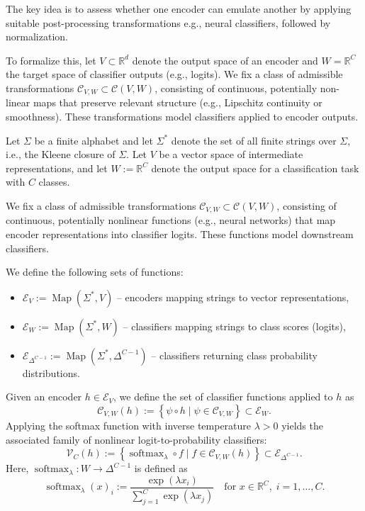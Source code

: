 The key idea is to assess whether one encoder can emulate another by applying suitable post-processing transformations e.g., neural classifiers, followed by normalization.

To formalize this, let \( V \subset \mathbb{R}^d \) denote the output space of an encoder and \( W = \mathbb{R}^C \) the target space of classifier outputs (e.g., logits).
We fix a class of admissible transformations \( \mathcal{C}_{V,W} \subset \mathcal{C}(V,W) \), consisting of continuous, potentially non-linear maps that preserve relevant structure (e.g., Lipschitz continuity or smoothness). 
These transformations model classifiers applied to encoder outputs.

Let $\Sigma$ be a finite alphabet and let $\Sigma^*$ denote the set of all finite strings over $\Sigma$, i.e., the Kleene closure of $\Sigma$.  
Let $V$ be a vector space of intermediate representations, and let $W := \mathbb{R}^C$ denote the output space for a classification task with $C$ classes.

We fix a class of admissible transformations \( \mathcal{C}_{V,W} \subset \mathcal{C}(V, W) \), consisting of continuous, potentially nonlinear functions (e.g., neural networks) that map encoder representations into classifier logits. These functions model downstream classifiers.

We define the following sets of functions:
\begin{itemize}
	\item $\mathcal{E}_V := \operatorname{Map}(\Sigma^*, V)$ – encoders mapping strings to vector representations,
	\item $\mathcal{E}_W := \operatorname{Map}(\Sigma^*, W)$ – classifiers mapping strings to class scores (logits),
	\item $\mathcal{E}_{\Delta^{C-1}} := \operatorname{Map}(\Sigma^*, \Delta^{C-1})$ – classifiers returning class probability distributions.
\end{itemize}

Given an encoder $h \in \mathcal{E}_V$, we define the set of classifier functions applied to $h$ as
\[
\mathcal{C}_{V,W}(h) := \left\{ \psi \circ h \mid \psi \in \mathcal{C}_{V,W} \right\} \subset \mathcal{E}_W.
\]
Applying the softmax function with inverse temperature $\lambda > 0$ yields the associated family of nonlinear logit-to-probability classifiers:
\[
\mathcal{V}_C(h) := \left\{ \operatorname{softmax}_\lambda \circ f \mid f \in \mathcal{C}_{V,W}(h) \right\} \subset \mathcal{E}_{\Delta^{C-1}}.
\]
Here, $\operatorname{softmax}_\lambda: W \to \Delta^{C-1}$ is defined as
\[
\operatorname{softmax}_\lambda(x)_i := \frac{\exp(\lambda x_i)}{\sum_{j=1}^C \exp(\lambda x_j)} \quad \text{for } x \in \mathbb{R}^C,\; i = 1,\dots,C.
\]


